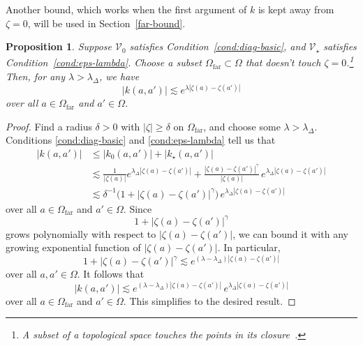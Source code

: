 \documentclass{article}
\theoremstyle{definition}
\theoremstyle{plain}
\newtheorem{prop}{Proposition}
\newcommand{\hardpart}{\mathcal{V}_0}
\newcommand{\softpart}{\mathcal{V}_\star}
\newcommand{\kerwhole}{k}
\newcommand{\hardker}{k_0}
\newcommand{\softker}{k_\star}
\newcommand{\domain}{\Omega}
\newcommand{\far}{\Omega_\text{far}}
\begin{document}
Another bound, which works when the first argument of $\kerwhole$ is kept away from $\zeta = 0$, will be used in Section~\ref{far-bound}.
\begin{prop}\label{prop:whole-ker-far-bound}
Suppose $\hardpart$ satisfies {\em Condition~\eqref{cond:diag-basic}}, and $\softpart$ satisfies {\em Condition~\eqref{cond:eps-lambda}}. Choose a subset $\far \subset \domain$ that doesn't touch $\zeta = 0$.\footnote{A subset of a topological space {\em touches} the points in its closure~\cite[Chapter~5, Definition~2.11]{joshi1983gen-top}.} Then, for any $\lambda > \lambda_\Delta$, we have
\[ |\kerwhole(a,a')| \lesssim e^{\lambda |\zeta(a)-\zeta(a')|} \]
over all $a \in \far$ and $a' \in \domain$.
\end{prop}
\begin{proof}
Find a radius $\delta > 0$ with $|\zeta| \ge \delta$ on $\far$, and choose some $\lambda > \lambda_\Delta$. Conditions \eqref{cond:diag-basic} and \eqref{cond:eps-lambda} tell us that
\begin{align*}
|\kerwhole(a,a')|&\leq |\hardker(a,a')| + |\softker(a,a')|\\
&\lesssim \frac{1}{|\zeta(a)|} e^{\lambda_\Delta |\zeta(a)-\zeta(a')|} + \frac{|\zeta(a)-\zeta(a')|^\gamma}{|\zeta(a)|}\,e^{\lambda_\Delta|\zeta(a)-\zeta(a')|}\\
&\lesssim \delta^{-1} \big(1 + |\zeta(a)-\zeta(a')|^\gamma \big) \, e^{\lambda_\Delta|\zeta(a)-\zeta(a')|}
\end{align*}
over all $a \in \far$ and $a' \in \domain$. Since
\[ 1 + |\zeta(a)-\zeta(a')|^\gamma \]
grows polynomially with respect to $|\zeta(a)-\zeta(a')|$, we can bound it with any growing exponential function of $|\zeta(a)-\zeta(a')|$. In particular,
\[ 1 + |\zeta(a)-\zeta(a')|^\gamma \lesssim e^{(\lambda - \lambda_\Delta) |\zeta(a)-\zeta(a')|} \]
over all $a, a' \in \domain$. It follows that
\[ |\kerwhole(a,a')| \lesssim e^{(\lambda - \lambda_\Delta) |\zeta(a)-\zeta(a')|} \, e^{\lambda_\Delta|\zeta(a)-\zeta(a')|} \]
over all $a \in \far$ and $a' \in \domain$. This simplifies to the desired result.
\end{proof}
\end{document}
